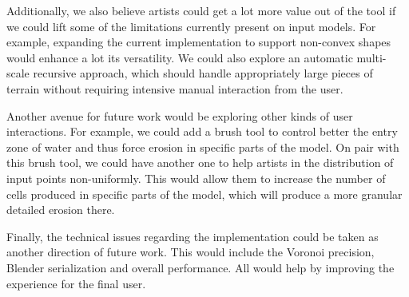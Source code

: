 \vspace{0.5\baselineskip}
Additionally, we also believe artists could get a lot more value out of the tool if we could lift some of the limitations currently present on input models. For example, expanding the current implementation to support non-convex shapes would enhance a lot its versatility. We could also explore an automatic multi-scale recursive approach, which should handle appropriately large pieces of terrain without requiring intensive manual interaction from the user.

\vspace{0.5\baselineskip}
Another avenue for future work would be exploring other kinds of user interactions. For example, we could add a brush tool to control better the entry zone of water and thus force erosion in specific parts of the model. On pair with this brush tool, we could have another one to help artists in the distribution of input points non-uniformly. This would allow them to increase the number of cells produced in specific parts of the model, which will produce a more granular detailed erosion there.

\vspace{0.5\baselineskip}
Finally, the technical issues regarding the implementation could be taken as another direction of future work. This would include the Voronoi precision, Blender serialization and overall performance. All would help by improving the experience for the final user.
